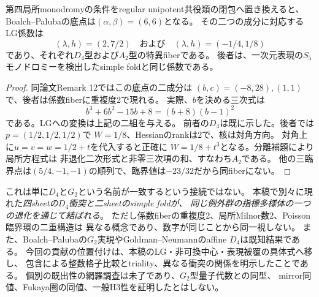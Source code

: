 \begin{corollary}[同じ$G_2$退化内の$D_4$と$A_2$]
\label{cor:G2-D4-A2}
第四局所monodromyの条件をregular unipotent共役類の閉包へ置き換えると、
Boalch--Palubaの底点は$(\alpha,\beta)=(6,6)$となる。
その二つの成分に対応するLG係数は
\[
 (\lambda,h)=(2,7/2)\quad\text{および}\quad
 (\lambda,h)=(-1/4,1/8)
\]
であり、それぞれ$D_4$型および$A_2$型の特異fiberである。
後者は、一次元表現の$S_5$モノドロミーを検出したsimple foldと同じ係数である。
\end{corollary}
\begin{proof}
同論文Remark 12ではこの底点の二成分は
$(b,c)=(-8,28),(1,1)$で、後者は係数fiberに重複度2で現れる。
実際、$b$を決める三次式は
\[
 b^3+6b^2-15b+8=(b+8)(b-1)^2
\]
である。LGへの変換は上記の二組を与える。
前者の$D_4$は既に示した。後者では$p=(1/2,1/2,1/2)$で
$W=1/8$、Hessianのrankは$2$で、核は対角方向。
対角上に$u=v=w=1/2+t$を代入すると正確に
$W=1/8+t^3$となる。分離補題により局所方程式は
非退化二次形式と非零三次項の和、すなわち$A_2$である。
他の三臨界点は$(5/4,-1,-1)$の順列で、臨界値は$-23/32$だから同fiberにない。
\end{proof}

これは単に$D_4$と$G_2$という名前が一致するという接続ではない。
本稿で別々に現れた\emph{四sheetの$D_4$衝突と二sheetのsimple foldが、
同じ例外群の指標多様体の一つの退化を通じて結ばれる}。
ただし係数fiberの重複度2、局所Milnor数2、Poisson臨界環の二重構造は
異なる概念であり、数字が同じことから同一視しない。
また、Boalch--Palubaの$G_2$実現やGoldman--Neumannのaffine $D_4$は既知結果である。
今回の貢献の位置付けは、本稿のLG・非可換中心・表現被覆の具体式へ移し、
包含による整数格子比較とtriality、異なる衝突の関係を明示したことである。
個別の既出性の網羅調査は未了であり、$G_2$型量子代数との同型、
mirror同値、Fukaya圏の同値、一般H3性を証明したとはしない。
